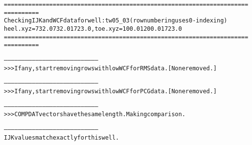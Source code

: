 \begin{alltt}
================================================================================
Checking IJK and WCF data for well: tw05_03 (row numbering uses 0-indexing)
heel.xyz = 732.0 732.0 1723.0, toe.xyz = 100.0 1200.0 1723.0
================================================================================

--------------------------------------------------------------------------------
>>> If any, start removing rows with low WCF for RMS data. [None removed.]

--------------------------------------------------------------------------------
>>> If any, start removing rows with low WCF for PCG data. [None removed.]

--------------------------------------------------------------------------------
>>> COMPDAT vectors have the same length. Making comparison.

--------------------------------------------------------------------------------
IJK values match exactly for this well.


\end{alltt}
